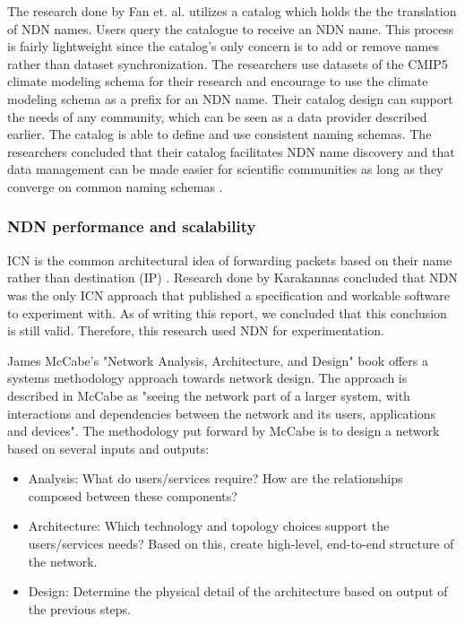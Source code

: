 The research done by Fan et. al. utilizes a catalog which holds the the translation of NDN names. Users query the catalogue to receive an NDN name. This process is fairly lightweight since the catalog's only concern is to add or remove names rather than dataset synchronization. The researchers use datasets of the CMIP5 climate modeling schema for their research and encourage to use the climate modeling schema as a prefix for an NDN name. 
Their catalog design can support the needs of any community, which can be seen as a data provider described earlier. The catalog is able to define and use consistent naming schemas.
The researchers concluded that their catalog facilitates NDN name discovery and that data management can be made easier for scientific communities as long as they converge on common naming schemas \cite{ndn-man}. 

\subsubsection{NDN performance and scalability}
\label{introduction-related-work-ndn}
ICN is the common architectural idea of forwarding packets based on their name rather than destination (IP) \cite{jacobson2009networking}. Research done by Karakannas \cite{icn-bd} concluded that NDN was the only ICN approach that published a specification and workable software to experiment with. As of writing this report, we concluded that this conclusion is still valid. Therefore, this research used NDN for experimentation.

James McCabe's "Network Analysis, Architecture, and Design" \cite{mccabe2010network} book offers a systems methodology approach towards network design. The approach is described in McCabe as "seeing the network part of a larger system, with interactions and dependencies between the network and its users, applications and devices". The methodology put forward by McCabe is to design a network based on several inputs and outputs:
\begin{itemize}
    \item Analysis: What do users/services require? How are the relationships composed between these components?
    \item Architecture: Which technology and topology choices support the users/services needs? Based on this, create high-level, end-to-end structure of the network.
    \item Design: Determine the physical detail of the architecture based on output of the previous steps.
\end{itemize}


